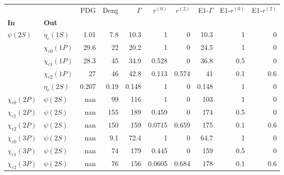 \begin{tabular}{l|l|r|r|r|r|r|r|r|r}
\toprule
                &            &   PDG &  Deng &  $\Gamma$ &  $r^{(0)}$ &  $r^{(2)}$ &  E1-$\Gamma$ &  E1-$r^{(0)}$ &  E1-$r^{(2)}$ \\
\textbf{In} & \textbf{Out} &       &       &           &            &            &              &               &               \\
\midrule
\textbf{$\psi(2S)$} & \textbf{$\eta_{c}(1S)$} &  1.01 &   7.8 &      10.3 &          1 &          0 &         10.3 &             1 &             0 \\
                & \textbf{$\chi_{c0}(1P)$} &  29.6 &    22 &      20.2 &          1 &          0 &         24.5 &             1 &             0 \\
                & \textbf{$\chi_{c1}(1P)$} &  28.3 &    45 &      34.9 &      0.528 &          0 &         36.8 &           0.5 &             0 \\
                & \textbf{$\chi_{c2}(1P)$} &    27 &    46 &      42.8 &      0.113 &      0.574 &           41 &           0.1 &           0.6 \\
                & \textbf{$\eta_{c}(2S)$} & 0.207 &  0.19 &     0.148 &          1 &          0 &        0.148 &             1 &             0 \\
\textbf{$\chi_{c0}(2P)$} & \textbf{$\psi(2S)$} &   nan &    99 &       116 &          1 &          0 &          103 &             1 &             0 \\
\textbf{$\chi_{c1}(2P)$} & \textbf{$\psi(2S)$} &   nan &   155 &       189 &      0.459 &          0 &          174 &           0.5 &             0 \\
\textbf{$\chi_{c2}(2P)$} & \textbf{$\psi(2S)$} &   nan &   150 &       159 &     0.0715 &      0.659 &          175 &           0.1 &           0.6 \\
\textbf{$\chi_{c0}(3P)$} & \textbf{$\psi(2S)$} &   nan &   9.1 &      72.4 &          1 &          0 &         64.7 &             1 &             0 \\
\textbf{$\chi_{c1}(3P)$} & \textbf{$\psi(2S)$} &   nan &    74 &       179 &      0.445 &          0 &          159 &           0.5 &             0 \\
\textbf{$\chi_{c2}(3P)$} & \textbf{$\psi(2S)$} &   nan &    76 &       156 &     0.0605 &      0.684 &          178 &           0.1 &           0.6 \\
\bottomrule
\end{tabular}
